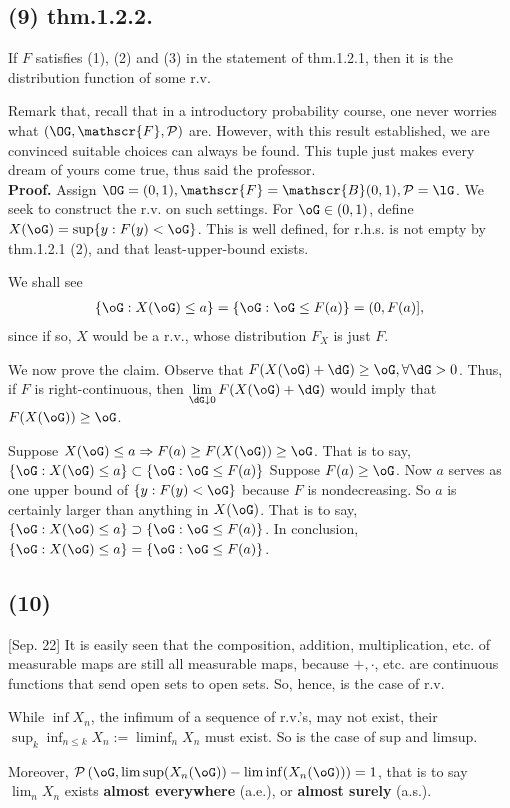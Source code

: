 \documentclass[12pt]{article}
\newcommand\M\cdot%
\newcommand\Ev\forall%
\newcommand{\Ip}{\Rightarrow} %
\newcommand{\Rb}[1]{ \left( #1 \right) }%
\newcommand{\CF}[1]{ \mathcal{#1} }%
\newcommand{\SF}[1]{ \mathscr{#1} }%
\newcommand{\Ss}[1]{\textsf{\textbf{#1}}}%
\newcommand{\EqGo}[1]{ \begin{gather*}{#1}\end{gather*} } %
\renewcommand{\P}[1]{ \CF{P} \Rb{#1} }%
\begin{document}
\subsection*{(9) thm.1.2.2.} If \(F\) satisfies (1), (2) and (3) in the statement of thm.1.2.1, 
then it is the distribution function of some r.v. \par
Remark that, recall that in a introductory probability course, one never worries what \((\OG, \SF{F}, \CF{P})\) are. 
However, with this result established, we are convinced suitable choices can always be found. 
This tuple just makes every dream of yours come true, thus said the professor. \\
\indent \Ss{Proof.} Assign \(\OG =(0,1), \SF{F} =\SF{B}(0,1), \CF{P} =\lG\). 
We seek to construct the r.v. on such settings. 
For \(\oG \in (0,1)\), define \( X(\oG) = \sup \{y: F(y)<\oG \} \). 
This is well defined, 
for r.h.s. is not empty by thm.1.2.1 (2), 
and that least-upper-bound exists. \par
We shall see \EqGo{
 \{ \oG: X(\oG) \leq a \} 
 = \{ \oG: \oG \leq F(a) \}
 = (0, F(a)],
} since if so, \(X\) would be a r.v., whose distribution \(F_X\) is just \(F\). \par
We now prove the claim. Observe that \(F( X(\oG)+\dG ) \geq \oG, \Ev \dG >0\). 
Thus, if \(F\) is right-continuous, then \( \lim\limits_{\dG \downarrow 0} F(X(\oG)+\dG) \) would imply that \(F(X(\oG)) \geq \oG\). \par
Suppose \(X(\oG) \leq a \Ip F(a) \geq F(X(\oG)) \geq \oG\). 
That is to say, \( \{ \oG: X(\oG) \leq a \} \subset \{ \oG: \oG \leq F(a) \} \)
Suppose \( F(a) \geq \oG \). Now \(a\) serves as one upper bound of \(\{y: F(y)<\oG \}\) because \(F\) is nondecreasing. 
So \(a\) is certainly larger than anything in \( X(\oG) \). 
That is to say, \( \{ \oG: X(\oG) \leq a \} \supset \{ \oG: \oG \leq F(a) \} \). 
In conclusion, \( \{ \oG: X(\oG) \leq a \} = \{ \oG: \oG \leq F(a) \} \).

\subsection*{(10)} [Sep. 22] It is easily seen that the composition, addition, multiplication, etc. of measurable maps are still all measurable maps, because \(+,\M\), etc. are continuous functions that send open sets to open sets. 
So, hence, is the case of r.v. \par
While \(\inf X_n\), the infimum of a sequence of r.v.'s, may not exist, 
their \(\sup_k \inf_{n \leq k} X_n := \liminf_n X_n\) must exist. 
So is the case of sup and limsup. \par
Moreover, \(\P{ \oG, \limsup(X_n(\oG)) - \liminf(X_n(\oG)) } =1\), 
that is to say \( \lim_n X_n \) exists \Ss{almost everywhere} (a.e.), or \Ss{ almost surely} (a.s.). 
\end{document}
